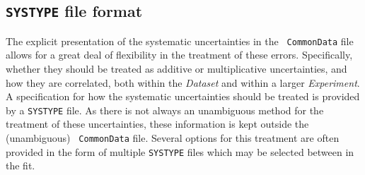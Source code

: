 \documentclass[11pt]{article}
\begin{document}
\subsection{{\tt SYSTYPE} file format}
The explicit presentation of the systematic uncertainties in the {\tt
CommonData} file allows for a great deal of flexibility in the treatment of
these errors. Specifically, whether they should be treated as additive or
multiplicative uncertainties, and how they are correlated, both within the
\emph{Dataset} and within a larger \emph{Experiment}. A specification for how
the systematic uncertainties should be treated is provided by a {\tt SYSTYPE}
file. As there is not always an unambiguous method for the treatment of these
uncertainties, these information is kept outside the (unambiguous) {\tt
CommonData} file. Several options for this treatment are often provided in the
form of multiple {\tt SYSTYPE} files which may be selected between in the fit.
\end{document}
